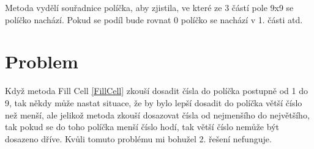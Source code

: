 Metoda vydělí souřadnice políčka, aby zjistila, ve které ze 3 částí pole 9x9 se políčko nachází. Pokud se podíl bude rovnat 0 políčko se nachází v 1. části atd.

\label{Problem}\section{Problem}
Když metoda Fill Cell \ref{FillCell} zkouší dosadit čísla do políčka postupně od 1 do 9, tak někdy může nastat situace, že by bylo lepší dosadit do políčka větší číslo než menší, ale jelikož metoda zkouší dosazovat čísla od nejmenšího do největšího, tak pokud se do toho políčka menší číslo hodí, tak větší číslo nemůže být dosazeno dříve. Kvůli tomuto problému mi bohužel 2. řešení nefunguje.